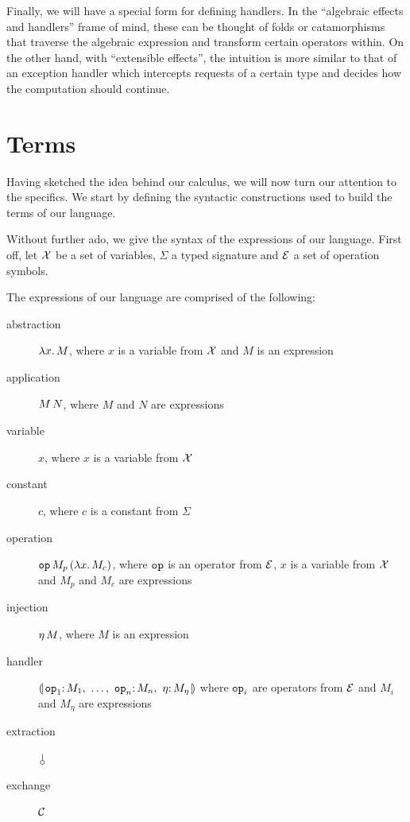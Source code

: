 Finally, we will have a special form for defining handlers. In the
``algebraic effects and handlers'' frame of mind, these can be thought of
folds or catamorphisms that traverse the algebraic expression and transform
certain operators within. On the other hand, with ``extensible effects'',
the intuition is more similar to that of an exception handler which
intercepts requests of a certain type and decides how the computation
should continue.

\section{Terms}

Having sketched the idea behind our calculus, we will now turn our
attention to the specifics. We start by defining the syntactic
constructions used to build the terms of our language.

Without further ado, we give the syntax of the expressions of our
language. First off, let $\mathcal{X}$ be a set of variables, $\Sigma$ a typed
signature and $\mathcal{E}$ a set of operation symbols.

The expressions of our language are comprised of the following:
\begin{description}
  \item[abstraction] $\lambda x.\, M$, where $x$ is a variable from $\mathcal{X}$ and
    $M$ is an expression
  \item[application] $M\,N$, where $M$ and $N$ are expressions
  \item[variable] $x$, where $x$ is a variable from $\mathcal{X}$
  \item[constant] $c$, where $c$ is a constant from $\Sigma$
  \item[operation] $\mathtt{op}\,M_p\,(\lambda x.\, M_c)$, where $\mathtt{op}$ is
    an operator from $\mathcal{E}$, $x$ is a variable from $\mathcal{X}$ and $M_p$ and
    $M_c$ are expressions
  \item[injection] $\eta\,M$, where $M$ is an expression
    \\ 
  \item[handler] $\cdbanana$
    where $\mathtt{op}_i$ are operators from $\mathcal{E}$ and $M_i$ and $M_\eta$ are
    expressions
  \item[extraction] $\cherry$
  \item[exchange] $\mathcal{C}$
\end{description}

